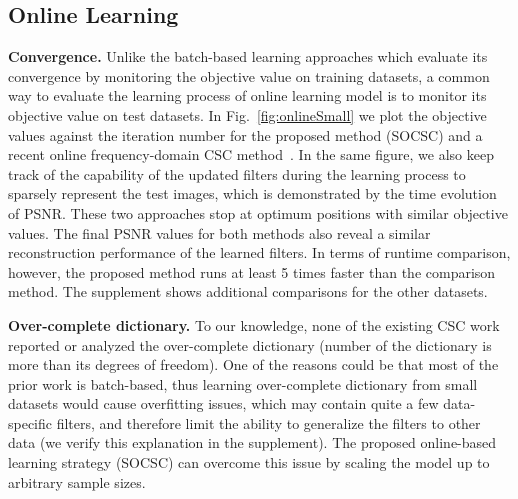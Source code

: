 \subsection{Online Learning}

{\bfseries Convergence.} Unlike the batch-based learning approaches
which evaluate its convergence by monitoring the objective value on
training datasets, a common way to evaluate the learning process of
online learning model is to monitor its objective value on test
datasets. In Fig.~\ref{fig:onlineSmall} we plot the objective values
against the iteration number for the proposed method (SOCSC) and a
recent online frequency-domain CSC method~\cite{liu-2018-first}. In
the same figure, we also keep track of the capability of the updated
filters during the learning process to sparsely represent the test
images, which is demonstrated by the time evolution of PSNR. These two
approaches stop at optimum positions with similar objective values.
The final PSNR values for both methods also reveal a similar
reconstruction performance of the learned filters. In terms of runtime
comparison, however, the proposed method runs at least 5 times faster
than the comparison method. The supplement shows additional comparisons
for the other datasets.


{\bfseries Over-complete dictionary.} To our knowledge, none of the
existing CSC work reported or analyzed the over-complete dictionary
(number of the dictionary is more than its degrees of freedom). One of
the reasons could be that most of the prior work is batch-based, thus
learning over-complete dictionary from small datasets would cause
overfitting issues, which may contain quite a few data-specific
filters, and therefore limit the ability to generalize the filters to
other data (we verify this explanation in the supplement). The
proposed online-based learning strategy (SOCSC) can overcome this
issue by scaling the model up to arbitrary sample sizes.

